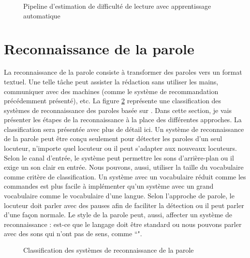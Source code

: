 \documentclass{KodeBook}
\begin{document}
\begin{figure}[!ht]
	\centering
	\caption[Pipeline d'estimation de difficulté de lecture avec apprentissage automatique]{Pipeline d'estimation de difficulté de lecture avec apprentissage automatique \cite{2014-collins}}
	\label{fig:lisibilite-collins}
\end{figure}


\section{Reconnaissance de la parole}

La reconnaissance de la parole consiste à transformer des paroles vers un format textuel. 
Une telle tâche peut assister la rédaction sans utiliser les mains, communiquer avec des machines (comme le système de recommandation précédemment présenté), etc. 
La figure \ref{fig:asr-classif} représente une classification des systèmes de reconnaissance des paroles basée sur \cite{2020-malik-al}.
Dans cette section, je vais présenter les étapes de la  reconnaissance à la place des différentes approches. 
La classification sera présentée avec plus de détail ici.
Un système de reconnaissance de la parole peut être conçu seulement pour détecter les paroles d'un seul locuteur, n'importe quel locuteur ou il peut s'adapter aux nouveaux locuteurs.
Selon le canal d'entrée, le système peut permettre les sons d'arrière-plan ou il exige un son clair en entrée.  
Nous pouvons, aussi, utiliser la taille du vocabulaire comme critère de classification.
Un système avec un vocabulaire réduit comme les commandes est plus facile à implémenter qu'un système avec un grand vocabulaire comme le vocabulaire d'une langue.
Selon l'approche de parole, le locuteur doit parler avec des pauses afin de faciliter la détection ou il peut parler d'une façon normale.
Le style de la parole peut, aussi, affecter un système de reconnaissance : est-ce que le langage doit être standard ou nous pouvons parler avec des sons qui n'ont pas de sens, comme ``".

\begin{figure}[!ht]
	\centering
	\caption{Classification des systèmes de reconnaissance de la parole}
	\label{fig:asr-classif}
\end{figure}
\end{document}
